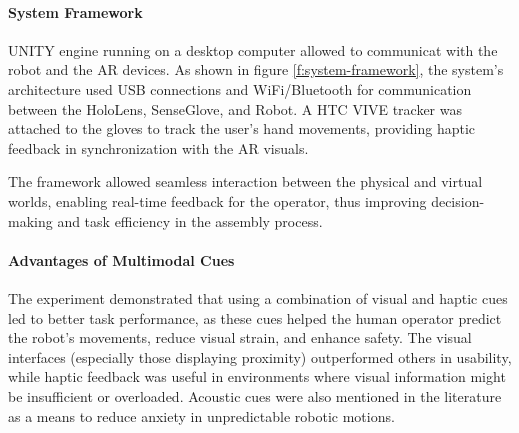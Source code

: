 \begin{enumerate}
    \paragraph{\textbf{System Framework}}
    UNITY engine running on a desktop computer allowed to communicat with the robot and the \ac{AR} devices. As shown in figure \ref{f:system-framework}, the system's architecture used USB connections and WiFi/Bluetooth for communication between the HoloLens, SenseGlove, and Robot. A HTC VIVE tracker was attached to the gloves to track the user's hand movements, providing haptic feedback in synchronization with the \ac{AR} visuals.


    The framework allowed seamless interaction between the physical and virtual worlds, enabling real-time feedback for the operator, thus improving decision-making and task efficiency in the assembly process.

    \paragraph{\textbf{Advantages of Multimodal Cues}}
    The experiment demonstrated that using a combination of visual and haptic cues led to better task performance, as these cues helped the human operator predict the robot's movements, reduce visual strain, and enhance safety. The visual interfaces (especially those displaying proximity) outperformed others in usability, while haptic feedback was useful in environments where visual information might be insufficient or overloaded. Acoustic cues were also mentioned in the literature as a means to reduce anxiety in unpredictable robotic motions.



\end{enumerate}
